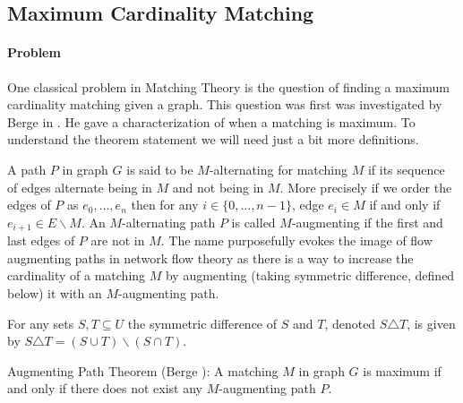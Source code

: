 \subsection{Maximum Cardinality Matching}
\paragraph{Problem} One classical problem in Matching Theory is the question of finding a maximum cardinality matching given a graph. This question was first was investigated by Berge in \cite{berge1957two}. He gave a characterization of when a matching is maximum. To understand the theorem statement we will need just a bit more definitions.
\begin{definition} A path $P$ in graph $G$ is said to be $M$-alternating for matching $M$ if its sequence of edges alternate being in $M$ and not being in $M$. More precisely if we order the edges of $P$ as $e_0, \dots, e_{n}$ then for any $i \in \{0, \dots, n-1\}$, edge $e_i \in M$ if and only if $e_{i+1} \in E \backslash M$. An $M$-alternating path $P$ is called $M$-augmenting if the first and last edges of $P$ are not in $M$. The name purposefully evokes the image of flow augmenting paths in network flow theory as there is a way to increase the cardinality of a matching $M$ by augmenting (taking symmetric difference, defined below) it with an $M$-augmenting path.
\end{definition}
\begin{definition} For any sets $S,T \subseteq U$ the symmetric difference of $S$ and $T$, denoted $S \triangle T$, is given by $S \triangle T = (S \cup T) \backslash (S \cap T)$. 
\end{definition}
\begin{theorem} Augmenting Path Theorem (Berge \cite{berge1957two}): A matching $M$ in graph $G$ is maximum if and only if there does not exist any $M$-augmenting path $P$.
\end{theorem}
